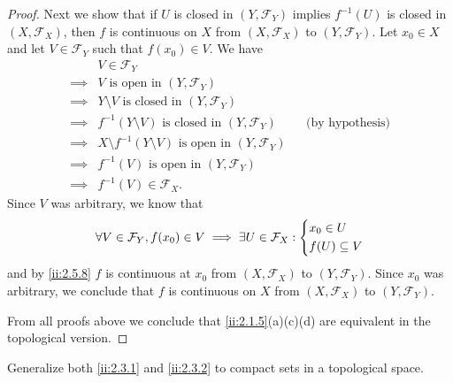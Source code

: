 \begin{proof}
  Next we show that if \(U\) is closed in \((Y, \mathcal{F}_Y)\) implies \(f^{-1}(U)\) is closed in \((X, \mathcal{F}_X)\), then \(f\) is continuous on \(X\) from \((X, \mathcal{F}_X)\) to \((Y, \mathcal{F}_Y)\).
  Let \(x_0 \in X\) and let \(V \in \mathcal{F}_Y\) such that \(f(x_0) \in V\).
  We have
  \begin{align*}
             & V \in \mathcal{F}_Y                                                                                  \\
    \implies & V \text{ is open in } (Y, \mathcal{F}_Y)                                                             \\
    \implies & Y \setminus V \text{ is closed in } (Y, \mathcal{F}_Y)                                               \\
    \implies & f^{-1}(Y \setminus V) \text{ is closed in } (Y, \mathcal{F}_Y)           &  & \text{(by hypothesis)} \\
    \implies & X \setminus f^{-1}(Y \setminus V) \text{ is open in } (Y, \mathcal{F}_Y)                             \\
    \implies & f^{-1}(V) \text{ is open in } (Y, \mathcal{F}_Y)                                                     \\
    \implies & f^{-1}(V) \in \mathcal{F}_X.
  \end{align*}
  Since \(V\) was arbitrary, we know that
  \[
    \forall V \in \mathcal{F}_Y, f(x_0) \in V \implies \exists U \in \mathcal{F}_X : \begin{dcases}
      x_0 \in U \\
      f(U) \subseteq V
    \end{dcases}
  \]
  and by \cref{ii:2.5.8} \(f\) is continuous at \(x_0\) from \((X, \mathcal{F}_X)\) to \((Y, \mathcal{F}_Y)\).
  Since \(x_0\) was arbitrary, we conclude that \(f\) is continuous on \(X\) from \((X, \mathcal{F}_X)\) to \((Y, \mathcal{F}_Y)\).

  From all proofs above we conclude that \cref{ii:2.1.5}(a)(c)(d) are equivalent in the topological version.
\end{proof}

\begin{ex}\label{ii:ex:2.5.17}
  Generalize both \cref{ii:2.3.1} and \cref{ii:2.3.2} to compact sets in a topological space.
\end{ex}

